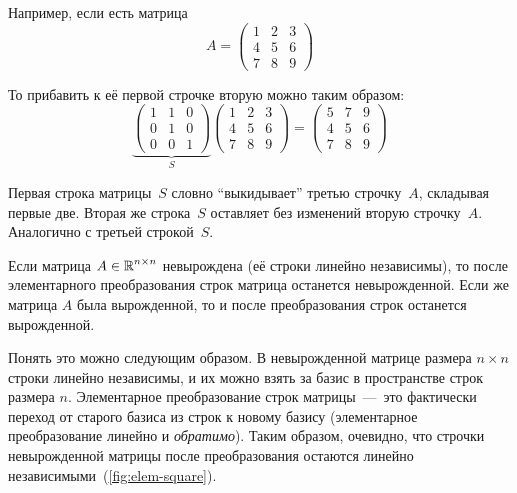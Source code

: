 \documentclass[a4paper,12pt]{article}
\begin{document}
    \begin{example}
      Например, если есть матрица
      \[
        A = \begin{pmatrix}
          1 & 2 & 3\\
          4 & 5 & 6\\
          7 & 8 & 9
        \end{pmatrix}
      \]
      
      То прибавить к её первой строчке вторую можно таким образом:
      \[
        \underbrace{\begin{pmatrix}
          1 & 1 & 0\\
          0 & 1 & 0\\
          0 & 0 & 1
        \end{pmatrix}}_{S}
        \begin{pmatrix}
          1 & 2 & 3\\
          4 & 5 & 6\\
          7 & 8 & 9
        \end{pmatrix}
        = \begin{pmatrix}
          5 & 7 & 9\\
          4 & 5 & 6\\
          7 & 8 & 9
        \end{pmatrix}
      \]
      
      Первая строка матрицы~$S$ словно ``выкидывает'' третью строчку~$A$, складывая первые две.
      Вторая же строка~$S$ оставляет без изменений вторую строчку~$A$.
      Аналогично с третьей строкой~$S$.
    \end{example}
    
    \begin{proposition}
      Если матрица $A \hm\in \RR^{n\times n}$ невырождена (её строки линейно независимы), то после элементарного преобразования строк матрица останется невырожденной.
      Если же матрица $A$ была вырожденной, то и после преобразования строк останется вырожденной.
    \end{proposition}
    
    Понять это можно следующим образом.
    В невырожденной матрице размера $n \times n$ строки линейно независимы, и их можно взять за базис в пространстве строк размера $n$.
    Элементарное преобразование строк матрицы~---~это фактически переход от старого базиса из строк к новому базису (элементарное преобразование линейно и \emph{обратимо}).
    Таким образом, очевидно, что строчки невырожденной матрицы после преобразования остаются линейно независимыми~(\ref{fig:elem-square}).
    
\end{document}
